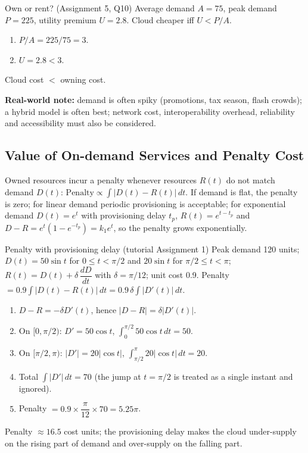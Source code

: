 \begin{solved}{Own or rent? (Assignment 5, Q10)}
\Given Average demand $A = 75$, peak demand $P = 225$, utility premium $U = 2.8$.
\Formula Cloud cheaper iff $U < P/A$.
\Steps
\begin{enumerate}[leftmargin=*]
  \item $P/A = 225/75 = 3$.
  \item $U = 2.8 < 3$.
\end{enumerate}
\Answer Cloud cost $<$ owning cost.
\end{solved}

\textbf{Real-world note:} demand is often spiky (promotions, tax season, flash crowds); a hybrid model is often best; network
cost, interoperability overhead, reliability and accessibility must also be considered.

\subsection{Value of On-demand Services and Penalty Cost}
Owned resources incur a penalty whenever resources $R(t)$ do not match demand $D(t)$:
$\text{Penalty} \propto \int |D(t) - R(t)|\,dt$. If demand is flat, the penalty is zero; for linear demand periodic provisioning is
acceptable; for exponential demand $D(t) = e^t$ with provisioning delay $t_p$, $R(t) = e^{t-t_p}$ and
$D - R = e^t(1 - e^{-t_p}) = k_1 e^t$, so the penalty grows exponentially.

\begin{solved}{Penalty with provisioning delay (tutorial Assignment 1)}
\Given Peak demand 120 units; $D(t) = 50\sin t$ for $0 \le t < \pi/2$ and $20\sin t$ for $\pi/2 \le t < \pi$;
$R(t) = D(t) + \delta\,\dfrac{dD}{dt}$ with $\delta = \pi/12$; unit cost 0.9.
\Formula Penalty $= 0.9 \int |D(t) - R(t)|\,dt = 0.9\,\delta \int |D'(t)|\,dt$.
\Steps
\begin{enumerate}[leftmargin=*]
  \item $D - R = -\delta D'(t)$, hence $|D - R| = \delta |D'(t)|$.
  \item On $[0,\pi/2)$: $D' = 50\cos t$, $\int_0^{\pi/2} 50\cos t\,dt = 50$.
  \item On $[\pi/2,\pi)$: $|D'| = 20|\cos t|$, $\int_{\pi/2}^{\pi} 20|\cos t|\,dt = 20$.
  \item Total $\int |D'|\,dt = 70$ (the jump at $t=\pi/2$ is treated as a single instant and ignored).
  \item Penalty $= 0.9 \times \dfrac{\pi}{12} \times 70 = 5.25\pi$.
\end{enumerate}
\Answer Penalty $\approx 16.5$ cost units; the provisioning delay makes the cloud under-supply on the rising part of demand and
over-supply on the falling part.
\end{solved}

